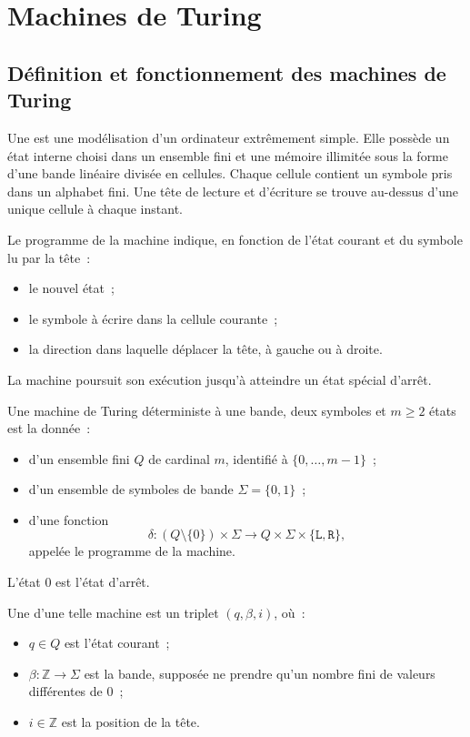 \section{Machines de Turing}
\label{section-turing-machines}

\subsection{Définition et fonctionnement des machines de Turing}

\thingy Une  est une
modélisation d'un ordinateur extrêmement simple.  Elle possède un état
interne choisi dans un ensemble fini et une mémoire illimitée sous la
forme d'une bande linéaire divisée en cellules.  Chaque cellule contient
un symbole pris dans un alphabet fini.  Une tête de lecture et
d'écriture se trouve au-dessus d'une unique cellule à chaque instant.

Le programme de la machine indique, en fonction de l'état courant et
du symbole lu par la tête :
\begin{itemize}
\item le nouvel état ;
\item le symbole à écrire dans la cellule courante ;
\item la direction dans laquelle déplacer la tête, à gauche ou à
  droite.
\end{itemize}
La machine poursuit son exécution jusqu'à atteindre un état spécial
d'arrêt.

\begin{defn}\label{definition-turing-machine}
Une machine de Turing déterministe à une bande, deux symboles et
$m\geq2$ états est la donnée :
\begin{itemize}
\item d'un ensemble fini $Q$ de cardinal $m$, identifié à
  $\{0,\ldots,m-1\}$ ;
\item d'un ensemble de symboles de bande
  $\Sigma=\{0,1\}$ ;
\item d'une fonction
\[
\delta\colon
(Q\setminus\{0\})\times\Sigma
 \longrightarrow
Q\times\Sigma\times\{\texttt{L},\texttt{R}\},
\]
appelée le programme de la machine.
\end{itemize}
L'état $0$ est l'état d'arrêt.
\end{defn}

Une  d'une telle machine est un triplet
$(q,\beta,i)$, où :
\begin{itemize}
\item $q\in Q$ est l'état courant ;
\item $\beta\colon\mathbb{Z}\to\Sigma$ est la bande, supposée ne prendre
  qu'un nombre fini de valeurs différentes de $0$ ;
\item $i\in\mathbb{Z}$ est la position de la tête.
\end{itemize}

